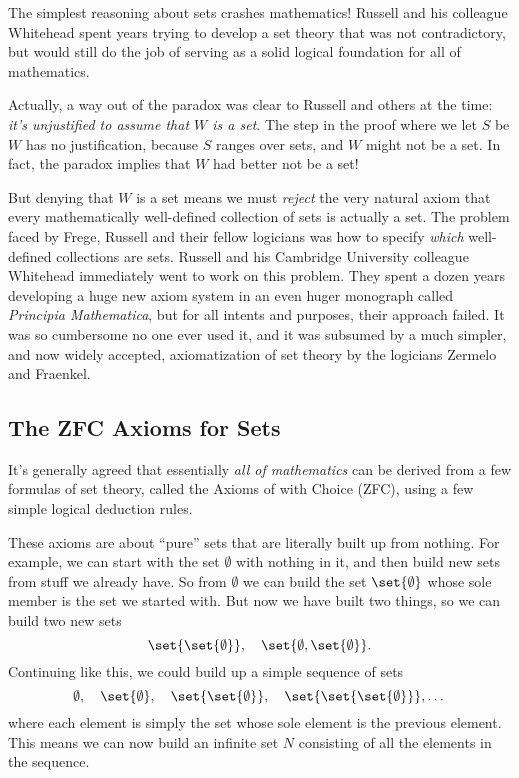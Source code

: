 The simplest reasoning about sets crashes mathematics!  Russell and his
colleague Whitehead spent years trying to develop a set theory that was
not contradictory, but would still do the job of serving as a solid
logical foundation for all of mathematics.

Actually, a way out of the paradox was clear to Russell and others at
the time: \emph{it's unjustified to assume that $W$ is a set}.  The
step in the proof where we let $S$ be $W$ has no justification,
because $S$ ranges over sets, and $W$ might not be a set.  In fact, the
paradox implies that $W$ had better not be a set!

But denying that $W$ is a set means we must \emph{reject} the very
natural axiom that every mathematically well-defined collection of
sets is actually a set.  The problem faced by Frege, Russell and their
fellow logicians was how to specify \emph{which} well-defined
collections are sets.  Russell and his Cambridge University colleague
Whitehead immediately went to work on this problem.  They spent a
dozen years developing a huge new axiom system in an even huger
monograph called \emph{Principia Mathematica}, but for all intents and
purposes, their approach failed.  It was so cumbersome no one ever
used it, and it was subsumed by a much simpler, and now widely
accepted, axiomatization of set theory by the logicians Zermelo
and Fraenkel.

\subsection{The ZFC Axioms for Sets}\label{ZFC_sec}

It's generally agreed that essentially \emph{all of mathematics} can
be derived from a few formulas of set theory, called the Axioms of
 with Choice (ZFC), using a few
simple logical deduction rules.

These axioms are about ``pure'' sets that are literally built up from
nothing.  For example, we can start with the set $\emptyset$ with
nothing in it, and then build new sets from stuff we already have.  So
from $\emptyset$ we can build the set $\set{\emptyset}$ whose sole
member is the set we started with.  But now we have built two things,
so we can build two new sets
\[
\set{\set{\emptyset}},\quad \set{\emptyset, \set{\emptyset}}.
\]
Continuing like this, we could build up a simple sequence of sets
\[
\emptyset,\quad \set{\emptyset},\quad \set{\set{\emptyset}},\quad \set{\set{\set{\emptyset}}},\dots
\]
where each element is simply the set whose sole element is the
previous element.  This means we can now build an infinite set $N$
consisting of all the elements in the sequence.

